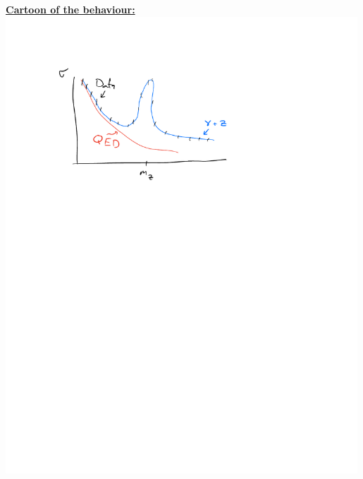 {\begin{minipage}{\textwidth}
\underline{\textbf{Cartoon of the behaviour:}}\\
\includegraphics[width=0.99\textwidth]{./ZPeak.pdf}
\end{minipage}

}
